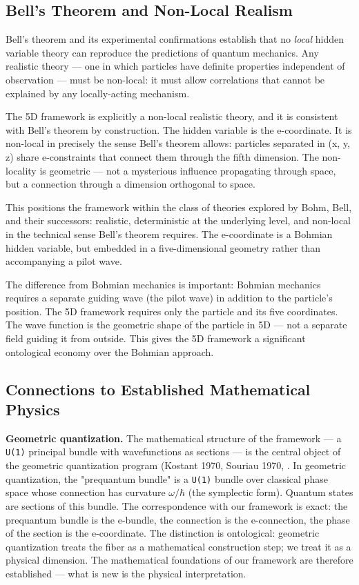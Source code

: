 \documentclass[aps,prd,preprint,superscriptaddress,longbibliography,floatfix]{revtex4-2}
\theoremstyle{remark}
\begin{document}
\subsection{Bell's Theorem and Non-Local Realism}

Bell's theorem and its experimental confirmations establish that no \textit{local} hidden variable theory can reproduce the predictions of quantum mechanics. Any realistic theory --- one in which particles have definite properties independent of observation --- must be non-local: it must allow correlations that cannot be explained by any locally-acting mechanism.

The 5D framework is explicitly a non-local realistic theory, and it is consistent with Bell's theorem by construction. The hidden variable is the e-coordinate. It is non-local in precisely the sense Bell's theorem allows: particles separated in (x, y, z) share e-constraints that connect them through the fifth dimension. The non-locality is geometric --- not a mysterious influence propagating through space, but a connection through a dimension orthogonal to space.

This positions the framework within the class of theories explored by Bohm, Bell, and their successors: realistic, deterministic at the underlying level, and non-local in the technical sense Bell's theorem requires. The e-coordinate is a Bohmian hidden variable, but embedded in a five-dimensional geometry rather than accompanying a pilot wave.

The difference from Bohmian mechanics is important: Bohmian mechanics requires a separate guiding wave (the pilot wave) in addition to the particle's position. The 5D framework requires only the particle and its five coordinates. The wave function is the geometric shape of the particle in 5D --- not a separate field guiding it from outside. This gives the 5D framework a significant ontological economy over the Bohmian approach.



\subsection{Connections to Established Mathematical Physics}

\textbf{Geometric quantization.} The mathematical structure of the framework --- a \texttt{U(1)} principal bundle with wavefunctions as sections --- is the central object of the geometric quantization program (Kostant 1970, Souriau 1970, \cite{Woodhouse1992}. In geometric quantization, the "prequantum bundle" is a \texttt{U(1)} bundle over classical phase space whose connection has curvature $\omega/\hbar$ (the symplectic form). Quantum states are sections of this bundle. The correspondence with our framework is exact: the prequantum bundle is the e-bundle, the connection is the e-connection, the phase of the section is the e-coordinate. The distinction is ontological: geometric quantization treats the fiber as a mathematical construction step; we treat it as a physical dimension. The mathematical foundations of our framework are therefore established --- what is new is the physical interpretation.
\end{document}
